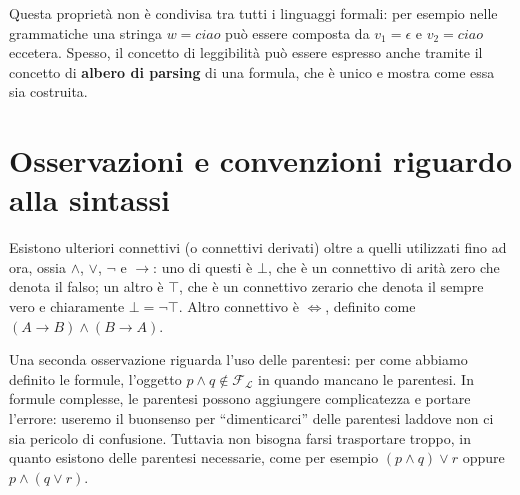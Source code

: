 Questa proprietà non è condivisa tra tutti i linguaggi formali: per 
esempio nelle grammatiche una stringa $w = ciao$ può essere composta da $v_1 = \epsilon$ 
e $v_2 = ciao$ eccetera. 
Spesso, il concetto di leggibilità può essere espresso anche tramite il concetto 
di \textbf{albero di parsing} di una formula, che è unico e mostra come 
essa sia costruita. 

\section{Osservazioni e convenzioni riguardo alla sintassi}
Esistono ulteriori connettivi (o connettivi derivati) oltre a quelli utilizzati fino ad ora, 
ossia $\land$, $\lor$, $\neg$ e $\rightarrow$: 
uno di questi è $\bot$, che è un connettivo di arità zero che denota il falso; un 
altro è $\top$, che è un connettivo zerario che denota il
sempre vero e chiaramente $\bot = \neg \top$. Altro connettivo è $\iff$, 
definito come $(A \rightarrow B) \land (B \rightarrow A)$.

Una seconda osservazione riguarda l'uso delle parentesi: per come abbiamo definito 
le formule, l'oggetto $p \land q \notin \mathscr{F}_\mathscr{L}$ in quando mancano le parentesi. 
In formule complesse, le parentesi possono aggiungere complicatezza e portare l'errore: 
useremo il buonsenso per ``dimenticarci'' delle parentesi laddove non ci sia 
pericolo di confusione. Tuttavia non bisogna farsi trasportare troppo, in quanto 
esistono delle parentesi necessarie, come per esempio $(p \land q ) \lor r$ 
oppure $p \land (q \lor r)$. 

